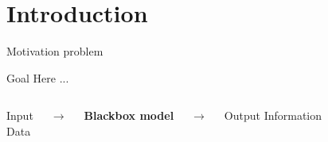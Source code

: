 \documentclass[t,9pt,aspectratio=169]{beamer}
\newcommand{\myred}[1]{{\color{red}#1}}
\newcommand{\mydarkgreen}[1]{{\color{JungleGreen}#1}}
\begin{document}
\section{Introduction}
\begin{frame}{Motivation problem}
 \begin{block}{Goal}
Here ...
 \end{block}
 
 
 \vspace{-0.5cm}
\begin{center}
\begin{columns}
\column{0.08\paperwidth}
\begin{center}
    \vspace{0.3cm}
\myred{Input} \\
Data %
\end{center}

\column{0.03\paperwidth}

\vspace{0.7cm}
{\large \textbf{$\bm{\rightarrow}$}}

\column{0.12\paperwidth}
\begin{block}{}
\begin{center}
{\large \bf Blackbox model}
\end{center}
\end{block}


\column{0.03\paperwidth}

\vspace{0.7cm}
{\large \textbf{$\bm{\rightarrow}$}}

\column{0.13\paperwidth}
\begin{center}
    \vspace{0.1cm}
\mydarkgreen{Output} Information
\end{center}

\column{0.03\paperwidth}


 
\end{columns}
\end{center} \vfill
\end{frame}

\end{document}
